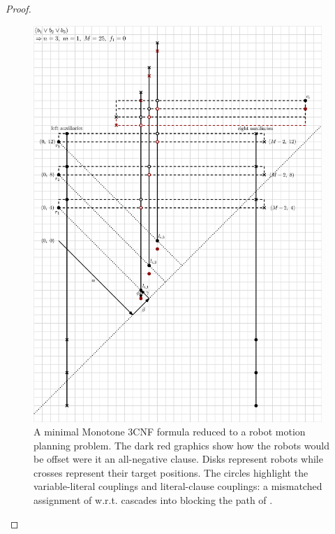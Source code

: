 \begin{proof}
\begin{figure}[h]
	\centering
	\includegraphics[height=15cm]{ipe/np_reduction.eps}
	\caption{
		A minimal Monotone 3CNF formula  reduced to a robot motion planning problem. The dark red graphics show how the robots would be offset were  it an all-negative clause. Disks represent robots while crosses represent their target positions. The circles highlight the variable-literal couplings and literal-clause couplings: a mismatched assignment of  w.r.t.  cascades into  blocking the path of .
	}\label{fig:full_reduction}
\end{figure}







\end{proof}
